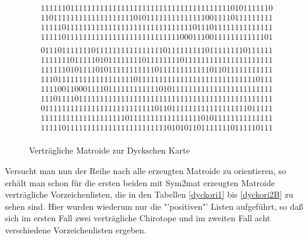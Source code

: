 \begin{figure}
{$$\begin{array}{c}
1111110111111111111111111111111111111111111110101111110\\
1101111111111111111111010111111111111110011110111111111\\
1111101111111111111111111111111111110111011111111111111\\
1111101111111111111111111111111110001110011111111111101\\
\end{array}$$
$$\begin{array}{c}
0111011111110111111111111111101111111110111111110111111\\
1111111011111010111111110111111110111111111111111111111\\
1111110101111010111111111110111111111111011011111111111\\
1110111111111111111111011111111111111111111111111110111\\
1111001100011110111111111111010111111111111111111111111\\
1110111101111111111111111111111111111111111111111111111\\
0111111111111111111111111110110111111111111111111011111\\
1111111111111111111101111111111111111101011111111111111\\
1111101111111111111111111111110101011011111110111110111\\
\end{array}$$}
\caption{Verträgliche Matroide zur Dyckschen Karte}
\label{dyckmat}
\end{figure}

Versucht man nun der Reihe nach alle erzeugten Matroide zu orientieren,
so erhält man schon für die ersten beiden mit {\sc Sym2mat} erzeugten
Matroide verträgliche Vorzeichenlisten, die in den Tabellen \ref{dyckori1}
bis \ref{dyckori2B} zu sehen sind.
Hier wurden wiederum nur die "'positiven"' Listen aufgeführt, so daß sich
im ersten Fall zwei verträgliche Chirotope und im zweiten Fall acht
verschiedene Vorzeichenlisten ergeben.

